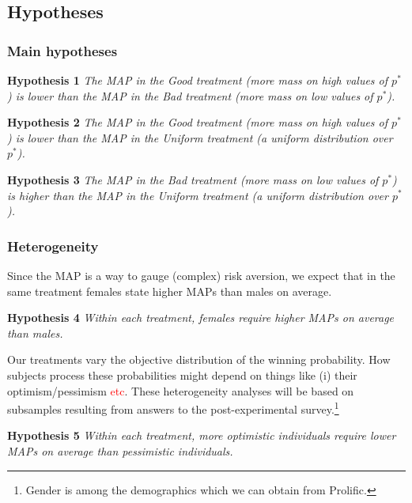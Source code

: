 \subsection{Hypotheses}
\subsubsection{Main hypotheses}
\noindent \textbf{Hypothesis 1} \quad \textit{The MAP in the Good treatment (more mass on high values of $p^*$) is lower than the MAP in the Bad treatment (more mass on low values of $p^*$).}

\noindent \textbf{Hypothesis 2} \quad \textit{The MAP in the Good treatment (more mass on high values of $p^*$) is lower than the MAP in the Uniform treatment (a uniform distribution over $p^*$).}

\noindent \textbf{Hypothesis 3} \quad \textit{The MAP in the Bad treatment (more mass on low values of $p^*$) is higher than the MAP in the Uniform treatment (a uniform distribution over $p^*$).}

\subsubsection{Heterogeneity}
Since the MAP is a way to gauge (complex) risk aversion, we expect that in the same treatment females state higher MAPs than males on average.

\noindent \textbf{Hypothesis 4} \quad \textit{Within each treatment, females require higher MAPs on average than males.}

Our treatments vary the objective distribution of the winning probability.
How subjects process these probabilities might depend on things like (i) their optimism/pessimism \textcolor{red}{etc}.
These heterogeneity analyses will be based on subsamples resulting from answers to the post-experimental survey.\footnote{
Gender is among the demographics which we can obtain from Prolific.
}

\noindent \textbf{Hypothesis 5} \quad \textit{Within each treatment, more optimistic individuals require lower MAPs on average than pessimistic individuals.}




